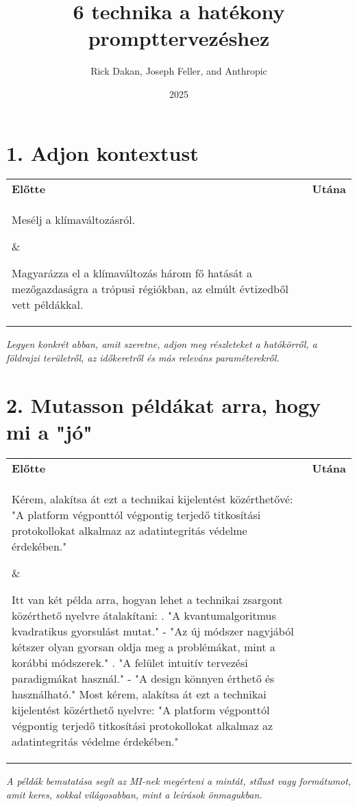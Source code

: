 \documentclass[a4paper, 12pt]{article}
\begin{document}
\title{6 technika a hatékony prompttervezéshez}
\author{Rick Dakan, Joseph Feller, and Anthropic}
\date{2025}
\maketitle

\section*{1. Adjon kontextust}
\begin{tabular}{p{} p{}}
\textbf{Előtte} & \textbf{Utána} \\
\parbox[t]{0.45\textwidth}{Mesélj a klímaváltozásról.} & \parbox[t]{0.45\textwidth}{Magyarázza el a klímaváltozás három fő hatását a mezőgazdaságra a trópusi régiókban, az elmúlt évtizedből vett példákkal.} \\
\end{tabular}
\textit{Legyen konkrét abban, amit szeretne, adjon meg részleteket a hatókörről, a földrajzi területről, az időkeretről és más releváns paraméterekről.}

\section*{2. Mutasson példákat arra, hogy mi a "jó"}
\begin{tabular}{p{} p{}}
\textbf{Előtte} & \textbf{Utána} \\
\parbox[t]{0.45\textwidth}{Kérem, alakítsa át ezt a technikai kijelentést közérthetővé: "A platform végponttól végpontig terjedő titkosítási protokollokat alkalmaz az adatintegritás védelme érdekében."} & \parbox[t]{0.45\textwidth}{Itt van két példa arra, hogyan lehet a technikai zsargont közérthető nyelvre átalakítani: . "A kvantumalgoritmus kvadratikus gyorsulást mutat." - "Az új módszer nagyjából kétszer olyan gyorsan oldja meg a problémákat, mint a korábbi módszerek." . "A felület intuitív tervezési paradigmákat használ." - "A design könnyen érthető és használható." \newline Most kérem, alakítsa át ezt a technikai kijelentést közérthető nyelvre: "A platform végponttól végpontig terjedő titkosítási protokollokat alkalmaz az adatintegritás védelme érdekében."} \\
\end{tabular}
\textit{A példák bemutatása segít az MI-nek megérteni a mintát, stílust vagy formátumot, amit keres, sokkal világosabban, mint a leírások önmagukban.}
\end{document}
